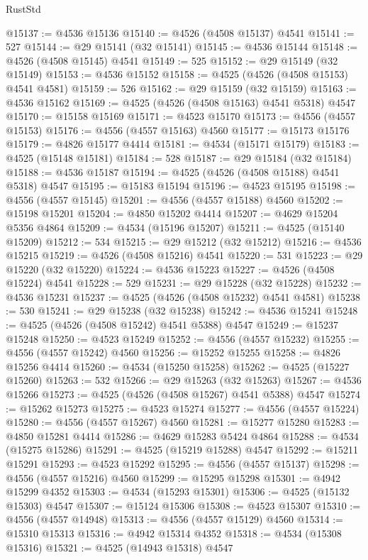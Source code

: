 \begin{lexlean}{RustStd}
\begin{coremodule}
@15137 := @4536 @15136
@15140 := @4526 (@4508 @15137) @4541
@15141 := 527
@15144 := @29 @15141 (@32 @15141)
@15145 := @4536 @15144
@15148 := @4526 (@4508 @15145) @4541
@15149 := 525
@15152 := @29 @15149 (@32 @15149)
@15153 := @4536 @15152
@15158 := @4525 (@4526 (@4508 @15153) @4541 @4581)
@15159 := 526
@15162 := @29 @15159 (@32 @15159)
@15163 := @4536 @15162
@15169 := @4525 (@4526 (@4508 @15163) @4541 @5318) @4547
@15170 := @15158 @15169
@15171 := @4523 @15170
@15173 := @4556 (@4557 @15153)
@15176 := @4556 (@4557 @15163) @4560
@15177 := @15173 @15176
@15179 := @4826 @15177 @4414
@15181 := @4534 (@15171 @15179)
@15183 := @4525 (@15148 @15181)
@15184 := 528
@15187 := @29 @15184 (@32 @15184)
@15188 := @4536 @15187
@15194 := @4525 (@4526 (@4508 @15188) @4541 @5318) @4547
@15195 := @15183 @15194
@15196 := @4523 @15195
@15198 := @4556 (@4557 @15145)
@15201 := @4556 (@4557 @15188) @4560
@15202 := @15198 @15201
@15204 := @4850 @15202 @4414
@15207 := @4629 @15204 @5356 @4864
@15209 := @4534 (@15196 @15207)
@15211 := @4525 (@15140 @15209)
@15212 := 534
@15215 := @29 @15212 (@32 @15212)
@15216 := @4536 @15215
@15219 := @4526 (@4508 @15216) @4541
@15220 := 531
@15223 := @29 @15220 (@32 @15220)
@15224 := @4536 @15223
@15227 := @4526 (@4508 @15224) @4541
@15228 := 529
@15231 := @29 @15228 (@32 @15228)
@15232 := @4536 @15231
@15237 := @4525 (@4526 (@4508 @15232) @4541 @4581)
@15238 := 530
@15241 := @29 @15238 (@32 @15238)
@15242 := @4536 @15241
@15248 := @4525 (@4526 (@4508 @15242) @4541 @5388) @4547
@15249 := @15237 @15248
@15250 := @4523 @15249
@15252 := @4556 (@4557 @15232)
@15255 := @4556 (@4557 @15242) @4560
@15256 := @15252 @15255
@15258 := @4826 @15256 @4414
@15260 := @4534 (@15250 @15258)
@15262 := @4525 (@15227 @15260)
@15263 := 532
@15266 := @29 @15263 (@32 @15263)
@15267 := @4536 @15266
@15273 := @4525 (@4526 (@4508 @15267) @4541 @5388) @4547
@15274 := @15262 @15273
@15275 := @4523 @15274
@15277 := @4556 (@4557 @15224)
@15280 := @4556 (@4557 @15267) @4560
@15281 := @15277 @15280
@15283 := @4850 @15281 @4414
@15286 := @4629 @15283 @5424 @4864
@15288 := @4534 (@15275 @15286)
@15291 := @4525 (@15219 @15288) @4547
@15292 := @15211 @15291
@15293 := @4523 @15292
@15295 := @4556 (@4557 @15137)
@15298 := @4556 (@4557 @15216) @4560
@15299 := @15295 @15298
@15301 := @4942 @15299 @4352
@15303 := @4534 (@15293 @15301)
@15306 := @4525 (@15132 @15303) @4547
@15307 := @15124 @15306
@15308 := @4523 @15307
@15310 := @4556 (@4557 @14948)
@15313 := @4556 (@4557 @15129) @4560
@15314 := @15310 @15313
@15316 := @4942 @15314 @4352
@15318 := @4534 (@15308 @15316)
@15321 := @4525 (@14943 @15318) @4547

\end{coremodule}
\end{lexlean}
